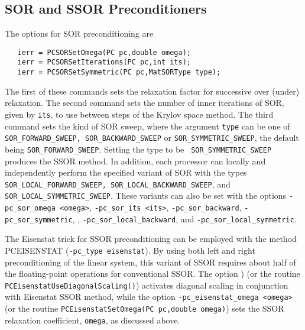 
\subsection{SOR and SSOR Preconditioners}

The options for SOR   
preconditioning are 
\begin{verbatim}
   ierr = PCSORSetOmega(PC pc,double omega);
   ierr = PCSORSetIterations(PC pc,int its);
   ierr = PCSORSetSymmetric(PC pc,MatSORType type);
\end{verbatim}
The  
first of these commands sets the relaxation factor for successive
over (under) relaxation.  The second command sets the number of inner
iterations of SOR, given by {\tt its}, to use between steps of the
Krylov space method.  The third command sets the kind of SOR sweep,
where the argument {\tt type} can be one of {\tt SOR\_FORWARD\_SWEEP,
SOR\_BACKWARD\_SWEEP} or {\tt SOR\_SYMMETRIC\_SWEEP}, the default
being {\tt SOR\_FORWARD\_SWEEP}. Setting the type to be {\tt
SOR\_SYMMETRIC\_SWEEP} produces the SSOR method.  In addition, 
each processor can locally and independently perform the specified 
variant of SOR with the types {\tt SOR\_LOCAL\_FORWARD\_SWEEP, 
SOR\_LOCAL\_BACKWARD\_SWEEP}, and {\tt SOR\_LOCAL\_SYMMETRIC\_SWEEP}.
These  
variants  
can  
also be set with the options {\tt -pc\_sor\_omega <omega>}, 
{\tt -pc\_sor\_its <its>}, {\tt -pc\_sor\_backward}, {\tt -pc\_sor\_symmetric}, 
, {\tt -pc\_sor\_local\_backward}, and 
{\tt -pc\_sor\_local\_symmetric}.
 
 
 

The Eisenstat trick \cite{eisenstat81}  for SSOR preconditioning 
can be employed with the method PCEISENSTAT  
({\tt -pc\_type eisenstat}).  
By using both left and right preconditioning of the linear system,
this variant of SSOR requires about half of the floating-point operations 
for conventional SSOR.  
 The option 
) 
(or the routine {\tt PCEisenstatUseDiagonalScaling()})
activates diagonal scaling in conjunction with Eisenstat SSOR method, while
the option {\tt -pc\_eisenstat\_omega <omega>} (or the routine
{\tt PCEisenstatSetOmega(PC pc,double omega)})
sets the SSOR relaxation coefficient, {\tt omega}, as discussed above.
  

